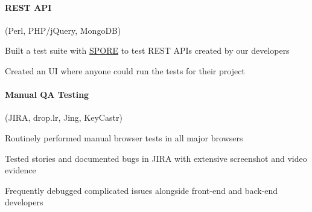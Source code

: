 \begin{position}
  \paragraph{REST API} (Perl, PHP/jQuery, MongoDB)
  \begin{myitem}
  \item Built a test suite with \href{https://github.com/SPORE}{SPORE} to test REST APIs created by our developers
  \item Created an UI where anyone could run the tests for their project
  \end{myitem}

  \paragraph{Manual QA Testing} (JIRA, drop.lr, Jing, KeyCastr)
  \begin{myitem}
  \item Routinely performed manual browser tests in all major browsers
  \item Tested stories and documented bugs in JIRA with extensive screenshot and video evidence
  \item Frequently debugged complicated issues alongside front-end and back-end developers
  \end{myitem}
\end{position}
